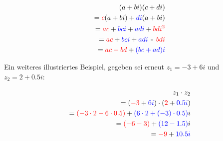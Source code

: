 \begin{equation}\label{eq:complex-numbers-multiplication}
  \begin{split}
    (a + bi)(c + di) \\
    = \begingroup\color{red} c\endgroup (a + bi)
      + \begingroup\color{blue} di\endgroup (a + bi) \\
    = \begingroup\color{red} ac\endgroup
      + \begingroup\color{blue} bci\endgroup
      + \begingroup\color{blue} adi\endgroup
      + \begingroup\color{red} bdi^2\endgroup \\
    = \begingroup\color{red} ac\endgroup
      + \begingroup\color{blue} bci\endgroup
      + \begingroup\color{blue} adi\endgroup
      \textbf{ - } \begingroup\color{red} bdi\endgroup \\
    = \begingroup\color{red} ac - bd\endgroup
      + \begingroup\color{blue}(bc + ad)i\endgroup \\
  \end{split}
\end{equation}

Ein weiteres illustriertes Beispiel, gegeben sei erneut
\(z_1 = -3 + 6i\) und \(z_2 = 2 + 0.5i\):

\begin{equation}\label{eq:complex-numbers-multiplication-example}
  \begin{split}
    z_1 \cdot z_2 \\
    = (\begingroup\color{red} -3\endgroup + \begingroup\color{blue} 6i\endgroup)
      \cdot (\begingroup\color{red} 2\endgroup + \begingroup\color{blue} 0.5i\endgroup) \\
    = \begingroup\color{red} (-3 \cdot 2 - 6 \cdot 0.5)\endgroup
      + \begingroup\color{blue} (6 \cdot 2 + (-3) \cdot 0.5)\endgroup i \\
    = \begingroup\color{red} (-6 - 3)\endgroup
      + \begingroup\color{blue} (12 - 1.5)\endgroup i \\
    = \begingroup\color{red} -9\endgroup + \begingroup\color{blue} 10.5i\endgroup
  \end{split}
\end{equation}
